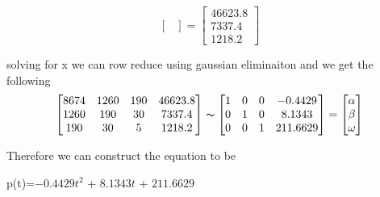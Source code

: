 \documentclass{article}
\begin{document}
\begin{enumerate}
\[\begin{bmatrix}
      \end{bmatrix}
      = 
      \begin{bmatrix}
        46623.8 \\
        7337.4 \\
        1218.2
      \end{bmatrix}
    \]
    \par
    solving for x we can row reduce using gaussian eliminaiton and we get the following
    \[
      \begin{bmatrix}
        8674 & 1260 & 190 & 46623.8 \\
        1260 & 190 & 30 & 7337.4 \\
        190 & 30 & 5 & 1218.2
      \end{bmatrix}
      \thicksim
      \begin{bmatrix}
        1 & 0 & 0 & -0.4429 \\
        0 & 1 & 0 & 8.1343 \\
        0 & 0 & 1 & 211.6629
      \end{bmatrix}
      = 
      \begin{bmatrix}
        \alpha \\
        \beta \\
        \omega
      \end{bmatrix}
    \]
    \par
    Therefore we can construct the equation to be

    \begin{center}
      p(t)=$-0.4429 t^2$ + $8.1343 t$ + $211.6629$
    \end{center}
  

\end{enumerate}
\end{document}
